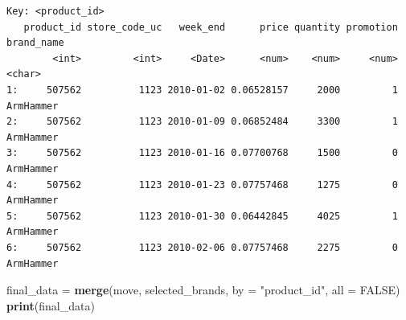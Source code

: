 \documentclass[
]{article}
\newenvironment{Shaded}{\begin{snugshade}}{\end{snugshade}}
\newcommand{\AttributeTok}[1]{\textcolor[rgb]{0.13,0.29,0.53}{#1}}
\newcommand{\ConstantTok}[1]{\textcolor[rgb]{0.56,0.35,0.01}{#1}}
\newcommand{\FunctionTok}[1]{\textcolor[rgb]{0.13,0.29,0.53}{\textbf{#1}}}
\newcommand{\NormalTok}[1]{#1}
\newcommand{\OtherTok}[1]{\textcolor[rgb]{0.56,0.35,0.01}{#1}}
\newcommand{\SpecialCharTok}[1]{\textcolor[rgb]{0.81,0.36,0.00}{\textbf{#1}}}
\newcommand{\StringTok}[1]{\textcolor[rgb]{0.31,0.60,0.02}{#1}}
\begin{document}
\begin{Shaded}
\end{Shaded}

\begin{verbatim}
Key: <product_id>
   product_id store_code_uc   week_end      price quantity promotion brand_name
        <int>         <int>     <Date>      <num>    <num>     <num>     <char>
1:     507562          1123 2010-01-02 0.06528157     2000         1  ArmHammer
2:     507562          1123 2010-01-09 0.06852484     3300         1  ArmHammer
3:     507562          1123 2010-01-16 0.07700768     1500         0  ArmHammer
4:     507562          1123 2010-01-23 0.07757468     1275         0  ArmHammer
5:     507562          1123 2010-01-30 0.06442845     4025         1  ArmHammer
6:     507562          1123 2010-02-06 0.07757468     2275         0  ArmHammer
\end{verbatim}

\begin{Shaded}
\begin{Highlighting}[]
\NormalTok{final\_data }\OtherTok{=} \FunctionTok{merge}\NormalTok{(move, selected\_brands, }\AttributeTok{by =} \StringTok{"product\_id"}\NormalTok{, }\AttributeTok{all =} \ConstantTok{FALSE}\NormalTok{)}
\FunctionTok{print}\NormalTok{(final\_data)}
\end{Highlighting}
\end{Shaded}
\end{document}
